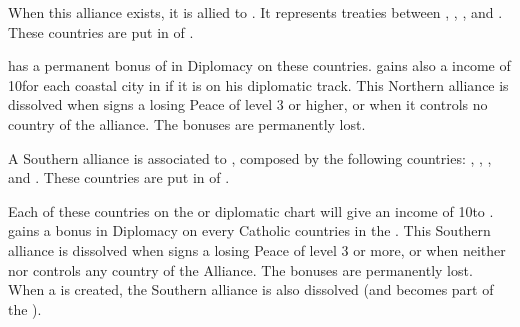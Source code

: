 \begin{digressions}



  \effetlong
  \aparag When this alliance exists, it is allied to \HOLhol.  It represents
  treaties between \paysOldenburg, \paysHanovre, \paysHesse, \paysHanse and
  \paysBerg.
  \bparag These countries are put in \AM of \HOL.

  \aparag \HOL has a permanent bonus of  in Diplomacy on these
  countries.
  \aparag \HOL gains also a income of 10\ducats for each coastal city in
  \paysHanse if it is on his diplomatic track.
  \bparag This Northern alliance is dissolved when \HOL signs a losing Peace
  of level 3 or higher, or when it controls no country of the alliance. The
  bonuses are permanently lost.



  \effetlong
  \aparag A Southern \HRE alliance is associated to \HAB, composed by the
  following countries: \paysBaviere, \paysMayence, \paysAlsace, \paysBade and
  \paysWurtemberg.
  \bparag These countries are put in \AM of \HAB.

  \aparag Each of these countries on the \HAB or \MAJHAB diplomatic chart will
  give an income of 10\ducats to \MAJHAB.
  \aparag \MAJHAB gains a  bonus in Diplomacy on every Catholic
  countries in the \HRE.
  \aparag This Southern alliance is dissolved when \MAJHAB signs a losing
  Peace of level 3 or more, or when neither \MAJHAB nor \HAB controls any
  country of the Alliance.  The bonuses are permanently lost.
  \aparag When a \GE is created, the Southern alliance is also dissolved (and
  becomes part of the \GE).




\end{digressions}

